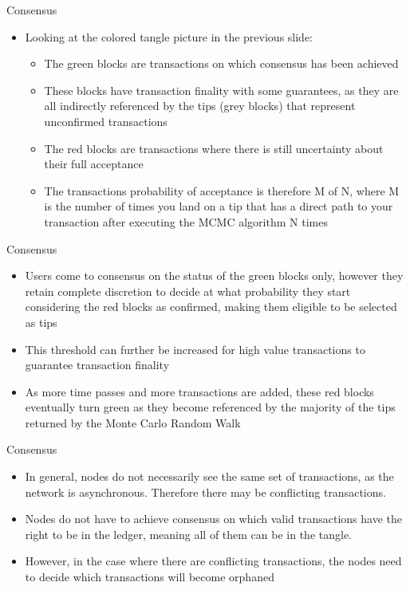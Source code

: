 \documentclass[9pt]{beamer}
\begin{document}

\begin{frame}{Consensus}
	\begin{itemize}
		\item Looking at the colored tangle picture in the previous slide:
		\begin{itemize}
			\item The green blocks are transactions on which consensus has been achieved
			\item These blocks have transaction finality with some guarantees, as they are all indirectly referenced by the tips (grey blocks) that represent unconfirmed transactions
			\item The red blocks are transactions where there is still uncertainty about their full acceptance
			\item The transactions probability of acceptance is therefore M of N, where M is the number of times you land on a tip that has a direct path to your transaction after executing the MCMC algorithm N times
		\end{itemize}
	\end{itemize}
\end{frame}


\begin{frame}{Consensus}
	\begin{itemize}
		\item Users come to consensus on the status of the green blocks only, however they retain complete discretion to decide at what probability they start considering the red blocks as confirmed, making them eligible to be selected as tips
		\item This threshold can further be increased for high value transactions to guarantee transaction finality
		\item As more time passes and more transactions are added, these red blocks eventually turn green as they become referenced by the majority of the tips returned by the Monte Carlo Random Walk
	\end{itemize}
\end{frame}


\begin{frame}{Consensus}
	\begin{itemize}
		\item In general, nodes do not necessarily see the same set of transactions, as the network is asynchronous. Therefore there may be conflicting transactions.
		\item Nodes do not have to achieve consensus on which valid transactions have the right to be in the ledger, meaning all of them can be in the tangle.
		\item However, in the case where there are conflicting transactions, the nodes need to decide which transactions will become orphaned
	\end{itemize}
\end{frame}
\end{document}
